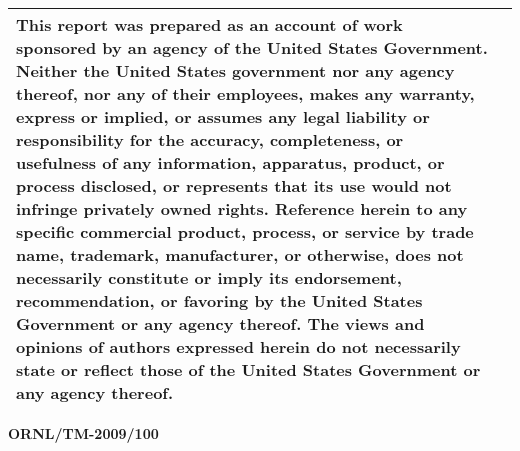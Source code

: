 \begin{longtable}{|p{4.443in}|p{0.057in}|}
\hline
\begin{minipage}[t]{4.443in}\raggedright %
{\small This report was prepared as an account of work sponsored by an agency of 
the United States Government. Neither the United States government nor any agency 
thereof, nor any of their employees, makes any warranty, express or implied, or 
assumes any legal liability or responsibility for the accuracy, completeness, or 
usefulness of any information, apparatus, product, or process disclosed, or represents 
that its use would not infringe privately owned rights. Reference herein to any 
specific commercial product, process, or service by trade name, trademark, manufacturer, 
or otherwise, does not necessarily constitute or imply its endorsement, recommendation, 
or favoring by the United States Government or any agency thereof. The views and 
opinions of authors expressed herein do not necessarily state or reflect those 
of the United States Government or any agency thereof.}\end{minipage}\\
\hline
\end{longtable}
\pagebreak{}

\vspace{12pt}
\begin{flushright}
\textbf{ORNL/TM-2009/100}
\end{flushright}

